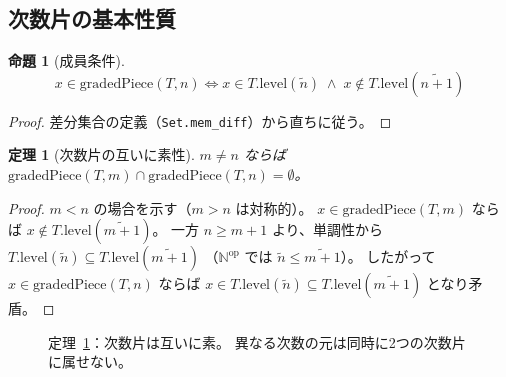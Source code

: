 \documentclass[a4paper,11pt]{ltjsarticle}
\theoremstyle{definition}
\theoremstyle{plain}
\newtheorem{theorem}[definition]{定理}
\newtheorem{proposition}[definition]{命題}
\theoremstyle{remark}
\begin{document}
\subsection{次数片の基本性質}

\begin{proposition}[成員条件]\label{prop:mem-graded-piece}
  \[
    x \in \mathrm{gradedPiece}(T,n) \iff
    x \in T.\mathrm{level}(\tilde{n}) \;\land\; x \notin T.\mathrm{level}(\widetilde{n+1})
  \]
\end{proposition}

\begin{proof}
  差分集合の定義（\texttt{Set.mem\_diff}）から直ちに従う。
\end{proof}

\begin{theorem}[次数片の互いに素性]\label{thm:graded-piece-disjoint}
  $m \neq n$ ならば $\mathrm{gradedPiece}(T,m) \cap \mathrm{gradedPiece}(T,n) = \emptyset$。
\end{theorem}

\begin{proof}
  $m < n$ の場合を示す（$m > n$ は対称的）。
  $x \in \mathrm{gradedPiece}(T,m)$ ならば $x \notin T.\mathrm{level}(\widetilde{m+1})$。
  一方 $n \geq m+1$ より、単調性から
  $T.\mathrm{level}(\tilde{n}) \subseteq T.\mathrm{level}(\widetilde{m+1})$
  （$\mathbb{N}^{\mathrm{op}}$ では $\tilde{n} \leq \widetilde{m+1}$）。
  したがって $x \in \mathrm{gradedPiece}(T,n)$ ならば $x \in T.\mathrm{level}(\tilde{n})
  \subseteq T.\mathrm{level}(\widetilde{m+1})$ となり矛盾。
\end{proof}

\begin{figure}[H]
\centering
{}
\caption{定理~\ref{thm:graded-piece-disjoint}：次数片は互いに素。
異なる次数の元は同時に2つの次数片に属せない。}
\label{fig:graded-disjoint}
\end{figure}
\end{document}
